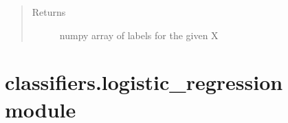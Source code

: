 \documentclass[letterpaper,10pt,english]{sphinxmanual}
\begin{document}
\begin{fulllineitems}
\begin{fulllineitems}
\begin{quote}
\begin{description}
\item[{Returns}] \leavevmode
numpy array of labels for the given X

\end{description}\end{quote}

\end{fulllineitems}


\end{fulllineitems}



\section{classifiers.logistic\_regression module}
\label{\detokenize{classifiers:module-classifiers.logistic_regression}}\label{\detokenize{classifiers:classifiers-logistic-regression-module}}
\end{document}
